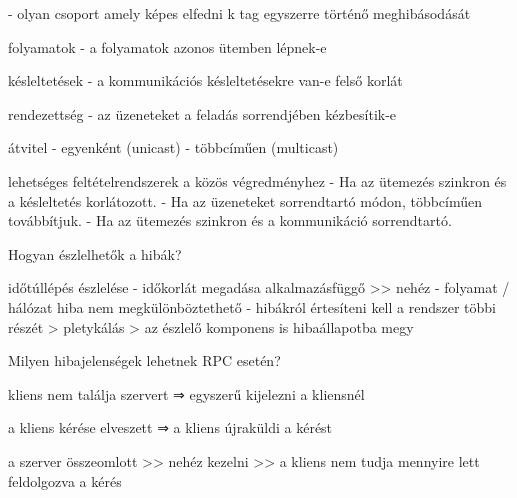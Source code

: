 \documentclass[twoside, a4paper, 12pt]{article}
\begin{document}
\begin{description}
                                        - olyan csoport amely képes elfedni k tag egyszerre történő meghibásodását
                                    \item folyamatok
                                        - a folyamatok azonos ütemben lépnek-e
                                    \item késleltetések
                                        - a kommunikációs késleltetésekre van-e felső korlát
                                    \item rendezettség
                                        - az üzeneteket a feladás sorrendjében kézbesítik-e
                                    \item átvitel
                                        - egyenként (unicast)
                                        - többcíműen (multicast)
                                    \item lehetséges feltételrendszerek a közös végredményhez 
                                        - Ha az ütemezés szinkron és a késleltetés korlátozott.
                                        - Ha az üzeneteket sorrendtartó módon, többcíműen továbbítjuk.
                                        - Ha az ütemezés szinkron és a kommunikáció sorrendtartó.
                                    \item  Hogyan észlelhetők a hibák?
                                    \item időtúllépés észlelése
                                        - időkorlát megadása alkalmazásfüggő >> nehéz
                                        - folyamat / hálózat hiba nem megkülönböztethető
                                        - hibákról értesíteni kell a rendszer többi részét
                                        > pletykálás
                                        > az észlelő komponens is hibaállapotba megy
                                    \item  Milyen hibajelenségek lehetnek RPC esetén?
                                    \item  kliens nem találja  szervert
                                        ⇒ egyszerű kijelezni a kliensnél
                                    \item a kliens kérése elveszett
                                        ⇒ a kliens újraküldi a kérést
                                    \item a szerver összeomlott
                                        >> nehéz kezelni >> a kliens nem tudja mennyire lett feldolgozva a kérés

\end{description}
\end{document}
